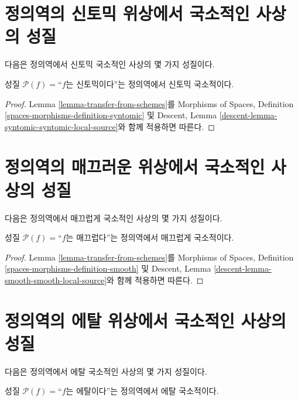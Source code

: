 \section{정의역의 신토믹 위상에서 국소적인 사상의 성질}
\label{section-syntomic-local-source}

\noindent
다음은 정의역에서 신토믹 국소적인 사상의 몇 가지 성질이다.

\begin{lemma}
\label{lemma-syntomic-syntomic-local-source}
성질 $\mathcal{P}(f)=$``$f$는 신토믹이다''는 정의역에서 신토믹
국소적이다.
\end{lemma}

\begin{proof}
Lemma \ref{lemma-transfer-from-schemes}를 Morphisms of Spaces, Definition
\ref{spaces-morphisms-definition-syntomic} 및 Descent, Lemma
\ref{descent-lemma-syntomic-syntomic-local-source}와 함께 적용하면 따른다.
\end{proof}

\section{정의역의 매끄러운 위상에서 국소적인 사상의 성질}
\label{section-smooth-local-source}

\noindent
다음은 정의역에서 매끄럽게 국소적인 사상의 몇 가지 성질이다.

\begin{lemma}
\label{lemma-smooth-smooth-local-source}
성질 $\mathcal{P}(f)=$``$f$는 매끄럽다''는 정의역에서 매끄럽게
국소적이다.
\end{lemma}

\begin{proof}
Lemma \ref{lemma-transfer-from-schemes}를 Morphisms of Spaces, Definition
\ref{spaces-morphisms-definition-smooth} 및 Descent, Lemma
\ref{descent-lemma-smooth-smooth-local-source}와 함께 적용하면 따른다.
\end{proof}

\section{정의역의 에탈 위상에서 국소적인 사상의 성질}
\label{section-etale-local-source}

\noindent
다음은 정의역에서 에탈 국소적인 사상의 몇 가지 성질이다.

\begin{lemma}
\label{lemma-etale-etale-local-source}
성질 $\mathcal{P}(f)=$``$f$는 에탈이다''는 정의역에서 에탈 국소적이다.
\end{lemma}

